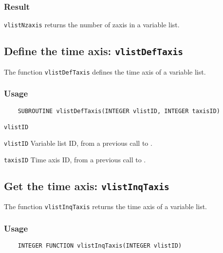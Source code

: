 \subsubsection*{Result}

{\texttt{vlistNzaxis}} returns the number of zaxis in a variable list.



\subsection{Define the time axis: \texttt{vlistDefTaxis}}
\label{vlistDefTaxis}

The function {\texttt{vlistDefTaxis}} defines the time axis of a variable list.

\subsubsection*{Usage}

\begin{verbatim}
    SUBROUTINE vlistDefTaxis(INTEGER vlistID, INTEGER taxisID)
\end{verbatim}

\hspace*{4mm}\begin{minipage}[]{15cm}
\begin{deflist}{\texttt{vlistID}\ }
\item[\texttt{vlistID}]
Variable list ID, from a previous call to {}.
\item[\texttt{taxisID}]
Time axis ID, from a previous call to {}.

\end{deflist}
\end{minipage}


\subsection{Get the time axis: \texttt{vlistInqTaxis}}
\label{vlistInqTaxis}

The function {\texttt{vlistInqTaxis}} returns the time axis of a variable list.

\subsubsection*{Usage}

\begin{verbatim}
    INTEGER FUNCTION vlistInqTaxis(INTEGER vlistID)
\end{verbatim}

